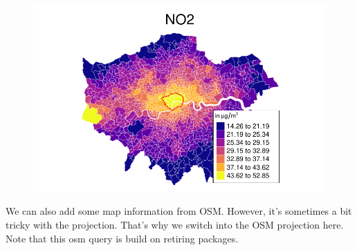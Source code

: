 \documentclass[
  letterpaper,
]{scrbook}
\begin{document}
\begin{figure}[H]

{\centering \includegraphics{02_spatial-data_files/figure-pdf/unnamed-chunk-18-1.pdf}

}

\end{figure}

We can also add some map information from OSM. However, it's sometimes a
bit tricky with the projection. That's why we switch into the OSM
projection here. Note that this osm query is build on retiring packages.
\end{document}
